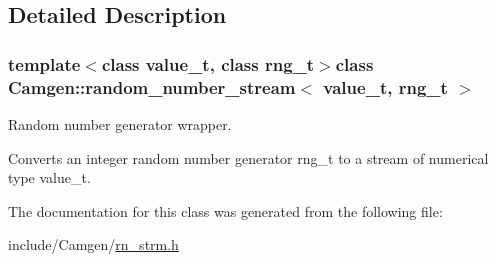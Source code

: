 \subsection{Detailed Description}
\subsubsection*{template$<$class value\+\_\+t, class rng\+\_\+t$>$class Camgen\+::random\+\_\+number\+\_\+stream$<$ value\+\_\+t, rng\+\_\+t $>$}

Random number generator wrapper. 

Converts an integer random number generator rng\+\_\+t to a stream of numerical type value\+\_\+t. 

The documentation for this class was generated from the following file\+:\begin{DoxyCompactItemize}
\item 
include/\+Camgen/\hyperlink{a00759}{rn\+\_\+strm.\+h}\end{DoxyCompactItemize}
